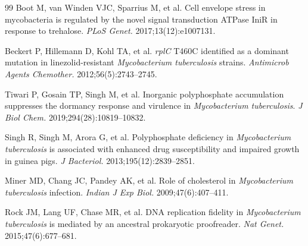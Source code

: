 \documentclass[11pt,a4paper]{article}
\begin{document}
\begin{thebibliography}{99}
	Boot M, van Winden VJC, Sparrius M, et al.
	Cell envelope stress in mycobacteria is regulated by the novel signal transduction ATPase IniR in response to trehalose.
	\textit{PLoS Genet.} 2017;13(12):e1007131.

	Beckert P, Hillemann D, Kohl TA, et al.
	\textit{rplC} T460C identified as a dominant mutation in linezolid-resistant \textit{Mycobacterium tuberculosis} strains.
	\textit{Antimicrob Agents Chemother.} 2012;56(5):2743--2745.

	Tiwari P, Gosain TP, Singh M, et al.
	Inorganic polyphosphate accumulation suppresses the dormancy response and virulence in \textit{Mycobacterium tuberculosis}.
	\textit{J Biol Chem.} 2019;294(28):10819--10832.

	Singh R, Singh M, Arora G, et al.
	Polyphosphate deficiency in \textit{Mycobacterium tuberculosis} is associated with enhanced drug susceptibility and impaired growth in guinea pigs.
	\textit{J Bacteriol.} 2013;195(12):2839--2851.

	Miner MD, Chang JC, Pandey AK, et al.
	Role of cholesterol in \textit{Mycobacterium tuberculosis} infection.
	\textit{Indian J Exp Biol.} 2009;47(6):407--411.

	Rock JM, Lang UF, Chase MR, et al.
	DNA replication fidelity in \textit{Mycobacterium tuberculosis} is mediated by an ancestral prokaryotic proofreader.
	\textit{Nat Genet.} 2015;47(6):677--681.

\end{thebibliography}

\clearpage

\end{document}
